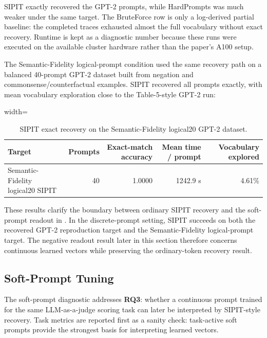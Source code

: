 \documentclass[12pt,a4paper,twoside,openright]{book}
\begin{document}
SIPIT exactly recovered the GPT-2 prompts, while HardPrompts was much weaker
under the same target. The BruteForce row is only a log-derived partial baseline:
the completed traces exhausted almost the full vocabulary without exact
recovery. Runtime is kept as a diagnostic number because these runs were
executed on the available cluster hardware rather than the paper's A100 setup.

The Semantic-Fidelity logical-prompt condition used the same recovery path on a
balanced 40-prompt GPT-2 dataset built from negation and
commonsense/counterfactual examples. SIPIT recovered all prompts exactly, with
mean vocabulary exploration close to the Table-5-style GPT-2 run:

\begin{table}[!htb]
    \centering
    \scriptsize
    \begin{adjustbox}{width=\textwidth}
    \begin{tabular}{l r r r r}
        \toprule
        \textbf{Target} & \textbf{Prompts} & \textbf{Exact-match accuracy} & \textbf{Mean time / prompt} & \textbf{Vocabulary explored} \\
        \midrule
        Semantic-Fidelity logical20 SIPIT & 40 & 1.0000 & 1242.9 s & 4.61\% \\
        \bottomrule
    \end{tabular}
    \end{adjustbox}
    \caption{SIPIT exact recovery on the Semantic-Fidelity logical20 GPT-2 dataset.}
    \label{tab:sipit-logical20-recovery}
\end{table}

These results clarify the boundary between ordinary SIPIT recovery and the
soft-prompt readout in . In the
discrete-prompt setting, SIPIT succeeds on both the recovered GPT-2 reproduction
target and the Semantic-Fidelity logical-prompt target. The negative readout
result later in this section therefore concerns continuous learned vectors while
preserving the ordinary-token recovery result.

\subsection{Soft-Prompt Tuning}
\label{subsec:results-soft-prompt}

The soft-prompt diagnostic addresses \textbf{RQ3}: whether a continuous prompt
trained for the same LLM-as-a-judge scoring task can later be interpreted by
SIPIT-style recovery. Task metrics are reported first as a sanity check:
task-active soft prompts provide the strongest basis for interpreting learned
vectors.
\end{document}
